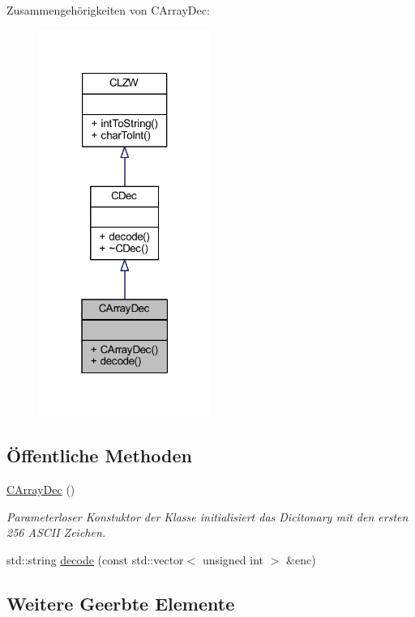 Zusammengehörigkeiten von C\+Array\+Dec\+:
\nopagebreak
\begin{figure}[H]
\begin{center}
\leavevmode
\includegraphics[width=159pt]{class_c_array_dec__coll__graph}
\end{center}
\end{figure}
\subsection*{Öffentliche Methoden}
\begin{DoxyCompactItemize}
\item 
\hyperlink{class_c_array_dec_a23b04c4bfd814351394427a5c867514b}{C\+Array\+Dec} ()
\begin{DoxyCompactList}\small\item\em Parameterloser Konstuktor der Klasse initialisiert das Dicitonary mit den ersten 256 A\+S\+C\+II Zeichen. \end{DoxyCompactList}\item 
std\+::string \hyperlink{class_c_array_dec_a59b83f47506de60b41728d6889d5643a}{decode} (const std\+::vector$<$ unsigned int $>$ \&enc)
\end{DoxyCompactItemize}
\subsection*{Weitere Geerbte Elemente}


